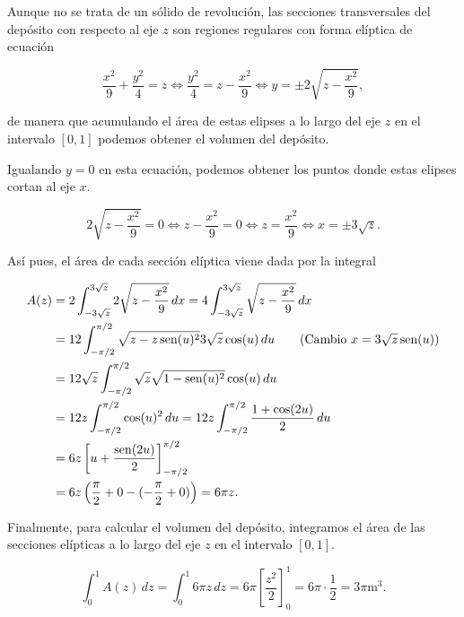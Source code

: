 \documentclass[
  spanish,
  a4paper,
]{scrreport}
\theoremstyle{definition}
\theoremstyle{remark}
\begin{document}
\begin{tcolorbox}[enhanced jigsaw, colbacktitle=quarto-callout-tip-color!10!white, opacityback=0, toptitle=1mm, title=\textcolor{quarto-callout-tip-color}{\faLightbulb}\hspace{0.5em}{Solución}, coltitle=black, opacitybacktitle=0.6, breakable, toprule=.15mm, leftrule=.75mm, titlerule=0mm, colframe=quarto-callout-tip-color-frame, left=2mm, bottomrule=.15mm, bottomtitle=1mm, arc=.35mm, rightrule=.15mm, colback=white]

Aunque no se trata de un sólido de revolución, las secciones
transversales del depósito con respecto al eje \(z\) son regiones
regulares con forma elíptica de ecuación

\[
\frac{x^2}{9} + \frac{y^2}{4} = z 
\Leftrightarrow \frac{y^2}{4} = z - \frac{x^2}{9}
\Leftrightarrow y = \pm 2\sqrt{z - \frac{x^2}{9}},
\]

de manera que acumulando el área de estas elipses a lo largo del eje
\(z\) en el intervalo \([0,1]\) podemos obtener el volumen del depósito.

Igualando \(y=0\) en esta ecuación, podemos obtener los puntos donde
estas elipses cortan al eje \(x\).

\[
2\sqrt{z - \frac{x^2}{9}} = 0 
\Leftrightarrow z - \frac{x^2}{9} = 0 
\Leftrightarrow z = \frac{x^2}{9}
\Leftrightarrow x = \pm 3\sqrt{z}.
\]

Así pues, el área de cada sección elíptica viene dada por la integral

\begin{align*}
A(z) 
&= 2\int_{-3\sqrt{z}}^{3\sqrt{z}} 2\sqrt{z - \frac{x^2}{9}}\,dx 
= 4\int_{-3\sqrt{z}}^{3\sqrt{z}} \sqrt{z - \frac{x^2}{9}}\,dx \\
&= 12 \int_{-\pi/2}^{\pi/2} \sqrt{z - z\operatorname{sen}(u)^2} 3\sqrt{z}\cos(u)\,du \tag{Cambio $x=3\sqrt{z}\operatorname{sen}(u)$}\\
&= 12\sqrt{z} \int_{-\pi/2}^{\pi/2} \sqrt{z}\sqrt{1 - \operatorname{sen}(u)^2}\cos(u)\,du \\
&= 12z \int_{-\pi/2}^{\pi/2} \cos(u)^2\,du
= 12z \int_{-\pi/2}^{\pi/2} \frac{1 + \cos(2u)}{2}\,du \\
&= 6z \left[ u + \frac{\operatorname{sen}(2u)}{2} \right]_{-\pi/2}^{\pi/2} \\
&= 6z \left( \frac{\pi}{2} + 0 - (-\frac{\pi}{2} + 0) \right)
= 6\pi z.
\end{align*}

Finalmente, para calcular el volumen del depósito, integramos el área de
las secciones elípticas a lo largo del eje \(z\) en el intervalo
\([0,1]\).

\[
\int_0^1 A(z)\,dz 
= \int_0^1 6\pi z\,dz 
= 6\pi \left[ \frac{z^2}{2} \right]_0^1
= 6\pi \cdot \frac{1}{2}
= 3\pi \mbox{m}^3.
\]

\end{tcolorbox}
\end{document}
